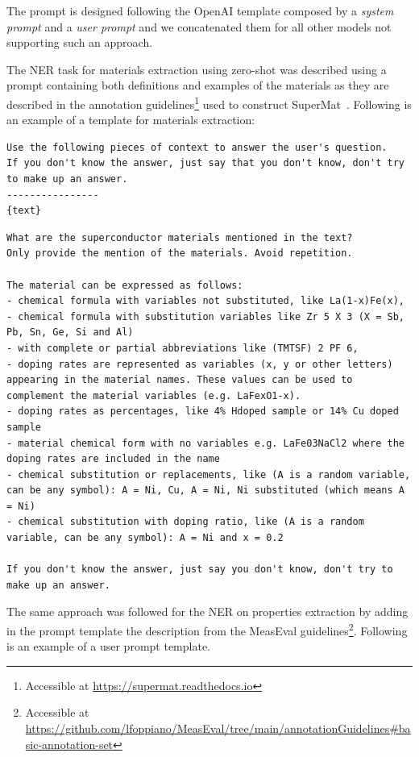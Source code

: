 \documentclass[a4paper]{article}
\begin{document}
The prompt is designed following the OpenAI template composed by a \textit{system prompt} and a \textit{user prompt} and we concatenated them for all other models not supporting such an approach.

The NER task for materials extraction using zero-shot was described using a prompt containing both definitions and examples of the materials as they are described in the annotation guidelines\footnote{Accessible at \url{https://supermat.readthedocs.io}} used to construct SuperMat~\cite{lfoppiano2021supermat}. 
Following is an example of a template for materials extraction: 

\begin{lstlisting}[caption=Generic system prompt common to all requests]
Use the following pieces of context to answer the user's question. 
If you don't know the answer, just say that you don't know, don't try to make up an answer. 
----------------
{text}
\end{lstlisting}


\begin{lstlisting}[caption=User prompt designed for extracting materials from text]
What are the superconductor materials mentioned in the text? 
Only provide the mention of the materials. Avoid repetition. 

The material can be expressed as follows:
- chemical formula with variables not substituted, like La(1-x)Fe(x),
- chemical formula with substitution variables like Zr 5 X 3 (X = Sb, Pb, Sn, Ge, Si and Al)
- with complete or partial abbreviations like (TMTSF) 2 PF 6,
- doping rates are represented as variables (x, y or other letters) appearing in the material names. These values can be used to complement the material variables (e.g. LaFexO1-x).
- doping rates as percentages, like 4% Hdoped sample or 14% Cu doped sample
- material chemical form with no variables e.g. LaFe03NaCl2 where the doping rates are included in the name
- chemical substitution or replacements, like (A is a random variable, can be any symbol): A = Ni, Cu, A = Ni, Ni substituted (which means A = Ni)
- chemical substitution with doping ratio, like (A is a random variable, can be any symbol): A = Ni and x = 0.2

If you don't know the answer, just say you don't know, don't try to make up an answer.
\end{lstlisting}

The same approach was followed for the NER on properties extraction by adding in the prompt template the description from the MeasEval guidelines\footnote{Accessible at \url{https://github.com/lfoppiano/MeasEval/tree/main/annotationGuidelines\#basic-annotation-set}}. Following is an example of a user prompt template. 
\end{document}
